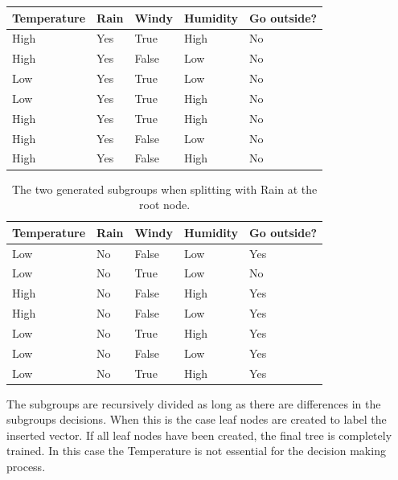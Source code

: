 \documentclass[
12pt,
headsepline,
bibliography=totoc,
twoside=semi,
fleqn
]{scrartcl}
\begin{document}
\begin{table}[h!]
   \begin{tabular}{|l|l|l|l||l|}
      \hline
      Temperature & Rain & Windy & Humidity & Go outside? \\
    \hline
    \hline
    High & Yes & True & High & No \\
    \hline
    High&  Yes& False & Low & No \\
    \hline
    Low& Yes & True & Low & No \\
    \hline
    Low&  Yes& True & High & No \\
    \hline
    High&  Yes& True & High &  No\\
    \hline
    High&  Yes&  False& Low & No \\
    \hline
    High& Yes & False & High & No\\
    \hline
   \end{tabular}
   \label{fig:fig101}
   \end{table}

   \begin{table}[h]
      \begin{tabular}{|l|l|l|l||l|}
      \hline
         Temperature & Rain & Windy & Humidity & Go outside? \\
       \hline
       \hline
      Low& No & False & Low & Yes \\
      \hline
      Low& No & True & Low & No \\
      \hline
      High& No & False &  High& Yes \\
      \hline
      High& No &  False&  Low& Yes \\
      \hline
      Low&  No& True & High &  Yes\\
      \hline
      Low&  No&  False& Low & Yes \\
      \hline
      Low&  No& True& High & Yes\\
      \hline
      \end{tabular}
      \label{fig:fig102}
      \caption{The two generated subgroups when splitting with Rain at the root node.}
      \end{table}

 The subgroups are recursively divided as long as there are differences in the subgroups decisions. When this is the case leaf nodes are created to label the inserted vector. If all leaf nodes have been created, the final tree is completely trained. In this case the Temperature is not essential for the decision making process.
\end{document}
